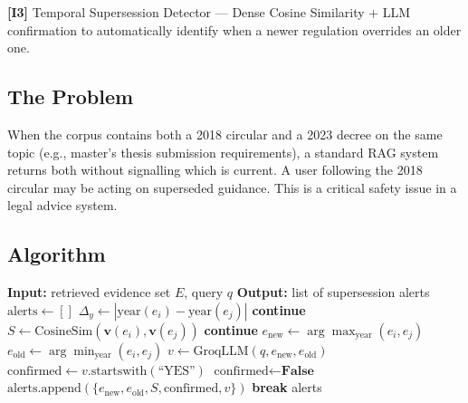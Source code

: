 \documentclass[12pt,a4paper]{article}
\newcommand{\innov}[2]{%
  \vspace{4pt}
  \noindent\colorbox{innovcolor!10}{\parbox{\dimexpr\linewidth-2\fboxsep}{%
    \small\textbf{\color{innovcolor}[I#1]} #2}}\vspace{4pt}}
\begin{document}
\innov{3}{Temporal Supersession Detector — Dense Cosine Similarity + LLM confirmation
to automatically identify when a newer regulation overrides an older one.}

\subsection{The Problem}

When the corpus contains both a 2018 circular and a 2023 decree on the same
topic (e.g., master's thesis submission requirements), a standard RAG system
returns both without signalling which is current. A user following the 2018
circular may be acting on superseded guidance. This is a critical safety issue
in a legal advice system.

\subsection{Algorithm}

\begin{algorithm}[H]
\caption{Temporal Supersession Detection [I3]}
\label{alg:supersession}
\begin{algorithmic}[1]
\State \textbf{Input:} retrieved evidence set $E$, query $q$
\State \textbf{Output:} list of supersession alerts
\State $\text{alerts} \gets []$
  \State $\Delta_y \gets |\text{year}(e_i) - \text{year}(e_j)|$
   \textbf{continue} \EndIf
  \State $S \gets \text{CosineSim}(\mathbf{v}(e_i), \mathbf{v}(e_j))$
   \textbf{continue} \EndIf
  \State $e_{\text{new}} \gets \arg\max_{\text{year}}(e_i, e_j)$
  \State $e_{\text{old}} \gets \arg\min_{\text{year}}(e_i, e_j)$
    \State $v \gets \text{GroqLLM}(q, e_{\text{new}}, e_{\text{old}})$
    \State $\text{confirmed} \gets v.\text{startswith}(\text{``YES''})$
  \Else
    \State $\text{confirmed} \gets \textbf{False}$
  \EndIf
  \State $\text{alerts.append}(\{e_{\text{new}}, e_{\text{old}}, S, \text{confirmed}, v\})$
   \textbf{break} \EndIf
\EndFor
\State \Return alerts
\end{algorithmic}
\end{algorithm}
\end{document}
